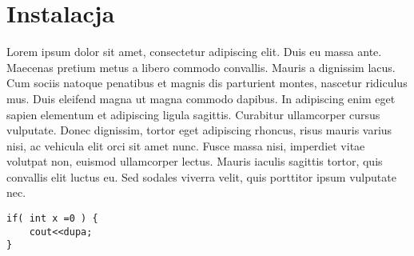 \section{Instalacja}
Lorem ipsum dolor sit amet, consectetur adipiscing elit. Duis eu massa ante. Maecenas pretium metus a libero commodo convallis. Mauris a dignissim lacus. Cum sociis natoque penatibus et magnis dis parturient montes, nascetur ridiculus mus. Duis eleifend magna ut magna commodo dapibus. In adipiscing enim eget sapien elementum et adipiscing ligula sagittis. Curabitur ullamcorper cursus vulputate. Donec dignissim, tortor eget adipiscing rhoncus, risus mauris varius nisi, ac vehicula elit orci sit amet nunc. Fusce massa nisi, imperdiet vitae volutpat non, euismod ullamcorper lectus. Mauris iaculis sagittis tortor, quis convallis elit luctus eu. Sed sodales viverra velit, quis porttitor ipsum vulputate nec.


\begin{lstlisting}
if( int x =0 ) {
	cout<<dupa;
}
\end{lstlisting}
